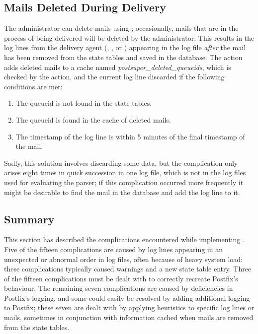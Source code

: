 \subsection{Mails Deleted During Delivery}

\label{Mails deleted during delivery}

The administrator can delete mails using ; occasionally,
mails that are in the process of being delivered will be deleted by the
administrator.  This results in the log lines from the delivery agent
(, , or ) appearing in the log
file \textit{after\/} the mail has been removed from the state tables and
saved in the database.  The  action adds deleted mails to a
cache named \textit{postsuper\_deleted\_queueids}, which is checked by the
 action, and the current log line discarded if the
following conditions are met:

\begin{enumerate}

    \item The queueid is not found in the state tables.

    \item The queueid is found in the cache of deleted mails.

    \item The timestamp of the log line is within 5 minutes of the final
        timestamp of the mail.

\end{enumerate}

Sadly, this solution involves discarding some data, but the complication
only arises eight times in quick succession in one log file, which is not
in the \numberOFlogFILES{} log files used for evaluating the parser; if
this complication occurred more frequently it might be desirable to find
the mail in the database and add the log line to it.

\subsection{Summary}

This section has described the complications encountered while implementing
\parsername{}.  Five of the fifteen complications are caused by log lines
appearing in an unexpected or abnormal order in log files, often because of
heavy system load: these complications typically caused warnings and a new
state table entry.  Three of the fifteen complications must be dealt with
to correctly recreate Postfix's behaviour.  The remaining seven
complications are caused by deficiencies in Postfix's logging, and some
could easily be resolved by adding additional logging to Postfix; these
seven are dealt with by applying heuristics to specific log lines or mails,
sometimes in conjunction with information cached when mails are removed
from the state tables.
